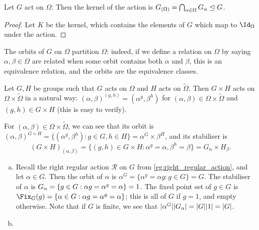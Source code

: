 \begin{proposition}\label{prop:kernel_action_stabiliser}
    Let $G$ act on $\Omega$. Then the kernel of the action is $\added{2}{G_{(\Omega)}} = \bigcap_{\alpha \in \Omega} \added{2}{G_\alpha} \trianglelefteq G$.
\end{proposition}

\begin{proof}
    Let $K$ be the kernel, which contains the elements of $G$ which map to $\Id_\Omega$ under the action. 
\end{proof}

The orbits of $G$ on $\Omega$ partition $\Omega$: indeed, if we define a relation on $\Omega$ by saying $\alpha,\beta \in \Omega$ are related when some orbit contains both $\alpha$ and $\beta$, this is an equivalence relation, and the orbits are the equivalence classes.

\begin{example}\label{eg:direct_product_action}
    Let $G,H$ be groups such that $G$ acts on $\Omega$ and $H$ acts on $\tilde\Omega$. Then $G \times H$ acts on $\Omega \times \tilde\Omega$ in a natural way: $(\alpha,\beta)^{(g,h)} = (\alpha^g,\beta^h)$ for $(\alpha,\beta) \in \Omega \times \tilde\Omega$ and $(g,h) \in G \times H$ (this is easy to verify).

    For $(\alpha,\beta) \in \Omega \times \tilde\Omega$, we can see that its orbit is $(\alpha,\beta)^{G \times H} = \{(\alpha^g,\beta^h) : g \in G,h \in H\} = \alpha^G \times \beta^H$, and its stabiliser is
    $$(G \times H)_{(\alpha,\beta)} = \{(g,h) \in G \times H : \alpha^g = \alpha,\beta^h = \beta\} = G_\alpha \times H_\beta.$$
\end{example}

\begin{example}\label{eg:rra_orbits_stabilisers}
    \begin{enumerate}[(a)]
        \item Recall the right regular action $\mathcal{R}$ on $G$ from \autoref{eg:right_regular_action}, and let $\alpha \in G$. Then the orbit of $\alpha$ is $\alpha^G = \{\alpha^g = \alpha g : g \in G\} = G$. The stabiliser of $\alpha$ is $\added{2}{G_\alpha} = \{g \in G : \alpha g = \alpha^g = \alpha\} = 1$. The fixed point set of $g \in G$ is $\Fix_G(g) = \{\alpha \in G : \alpha g = \alpha^g = \alpha\}$; this is all of $G$ if $g = 1$, and empty otherwise. Note that if $G$ is finite, we see that $|\alpha^G| |\added{2}{G_\alpha}| = |G| |1| = |G|$.
        \item {}
    \end{enumerate}
\end{example}

